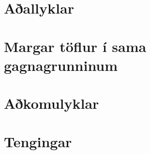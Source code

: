 \section{Aðallyklar} %
\section{Margar töflur í sama gagnagrunninum}
\section{Aðkomulyklar} %
\section{Tengingar} %
